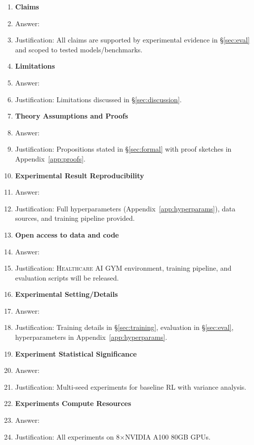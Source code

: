\documentclass{article}
\newcommand{\gym}{\textsc{Healthcare AI GYM}}
\begin{document}
\begin{enumerate}

\item {\bf Claims}
    \item[] Answer: \answerYes{}
    \item[] Justification: All claims are supported by experimental evidence in \S\ref{sec:eval} and scoped to tested models/benchmarks.

\item {\bf Limitations}
    \item[] Answer: \answerYes{}
    \item[] Justification: Limitations discussed in \S\ref{sec:discussion}.

\item {\bf Theory Assumptions and Proofs}
    \item[] Answer: \answerYes{}
    \item[] Justification: Propositions stated in \S\ref{sec:formal} with proof sketches in Appendix~\ref{app:proofs}.

    \item {\bf Experimental Result Reproducibility}
    \item[] Answer: \answerYes{}
    \item[] Justification: Full hyperparameters (Appendix~\ref{app:hyperparams}), data sources, and training pipeline provided.

\item {\bf Open access to data and code}
    \item[] Answer: \answerYes{}
    \item[] Justification: \gym{} environment, training pipeline, and evaluation scripts will be released.

\item {\bf Experimental Setting/Details}
    \item[] Answer: \answerYes{}
    \item[] Justification: Training details in \S\ref{sec:training}, evaluation in \S\ref{sec:eval}, hyperparameters in Appendix~\ref{app:hyperparams}.

\item {\bf Experiment Statistical Significance}
    \item[] Answer: \answerYes{}
    \item[] Justification: Multi-seed experiments for baseline RL with variance analysis.

\item {\bf Experiments Compute Resources}
    \item[] Answer: \answerYes{}
    \item[] Justification: All experiments on 8$\times$NVIDIA A100 80GB GPUs.


\end{enumerate}
\end{document}
